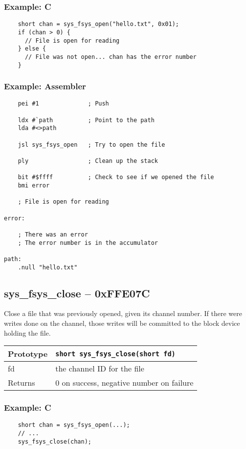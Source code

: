 \subsubsection*{Example: C}
\begin{lstlisting}
    short chan = sys_fsys_open("hello.txt", 0x01);
    if (chan > 0) {
      // File is open for reading
    } else {
      // File was not open... chan has the error number
    }
\end{lstlisting}

\subsubsection*{Example: Assembler}
\begin{verbatim}
    pei #1              ; Push 

    ldx #`path          ; Point to the path
    lda #<>path

    jsl sys_fsys_open   ; Try to open the file

    ply                 ; Clean up the stack

    bit #$ffff          ; Check to see if we opened the file
    bmi error

    ; File is open for reading

error:

    ; There was an error
    ; The error number is in the accumulator

path:
    .null "hello.txt"
\end{verbatim}


\subsection*{sys\_fsys\_close -- 0xFFE07C}
Close a file that was previously opened, given its channel number.
If there were writes done on the channel, those writes will be committed to the block device holding the file.

\bigskip

\begin{tabular}{|l||l|} \hline
Prototype & \lstinline!short sys_fsys_close(short fd)! \\ \hline
fd & the channel ID for the file \\ \hline
Returns & 0 on success, negative number on failure \\ \hline
\end{tabular}

\subsubsection*{Example: C}
\begin{lstlisting}
    short chan = sys_fsys_open(...);
    // ...
    sys_fsys_close(chan);
\end{lstlisting}

